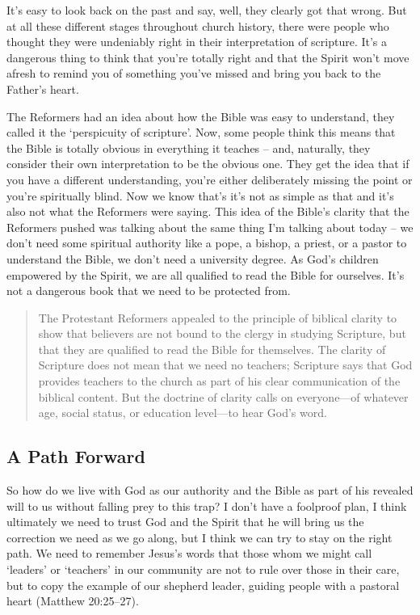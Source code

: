 It's easy to look back on the past and say, well, they clearly got that wrong.
But at all these different stages throughout church history, there were people
who thought they were undeniably right in their interpretation of scripture.
It's a dangerous thing to think that you're totally right and that the Spirit
won't move afresh to remind you of something you've missed and bring you back to
the Father's heart.

The Reformers had an idea about how the Bible was easy to understand, they
called it the `perspicuity of scripture'. Now, some people think this means that
the Bible is totally obvious in everything it teaches -- and, naturally, they
consider their own interpretation to be the obvious one. They get the idea that
if you have a different understanding, you're either deliberately missing the
point or you're spiritually blind. Now we know that's it's not as simple as that
and it's also not what the Reformers were saying. This idea of the Bible's
clarity that the Reformers pushed was talking about the same thing I'm talking
about today -- we don't need some spiritual authority like a pope, a bishop, a
priest, or a pastor to understand the Bible, we don't need a university degree.
As God's children empowered by the Spirit, we are all qualified to read the
Bible for ourselves. It's not a dangerous book that we need to be protected
from.

\begin{quote}
    The Protestant Reformers appealed to the principle of biblical clarity to
    show that believers are not bound to the clergy in studying Scripture, but
    that they are qualified to read the Bible for themselves. The clarity of
    Scripture does not mean that we need no teachers; Scripture says that God
    provides teachers to the church as part of his clear communication of the
    biblical content. But the doctrine of clarity calls on everyone---of
    whatever age, social status, or education level---to hear God's word.
\end{quote}

\subsection{A Path Forward}

So how do we live with God as our authority and the Bible as part of his
revealed will to us without falling prey to this trap? I don't have a foolproof
plan, I think ultimately we need to trust God and the Spirit that he will bring
us the correction we need as we go along, but I think we can try to stay on the
right path. We need to remember Jesus's words that those whom we might call
`leaders' or `teachers' in our community are not to rule over those in their
care, but to copy the example of our shepherd leader, guiding people with a
pastoral heart (Matthew 20:25--27).

